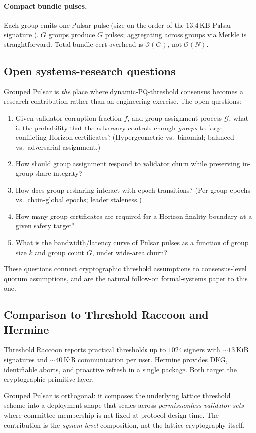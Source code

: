 \paragraph{Compact bundle pulses.}
Each group emits one Pulsar pulse (size on the order of the
$13.4\,\mathrm{KB}$ Pulsar signature \cite{pulsar}). $G$
groups produce $G$ pulses; aggregating across groups via Merkle is
straightforward. Total bundle-cert overhead is $\mathcal{O}(G)$, not
$\mathcal{O}(N)$.

\subsection{Open systems-research questions}

Grouped Pulsar is \emph{the} place where dynamic-PQ-threshold consensus
becomes a research contribution rather than an engineering exercise.
The open questions:

\begin{enumerate}[leftmargin=2em,nosep]
  \item Given validator corruption fraction $f$, and group assignment
        process $\mathcal{G}$, what is the probability that the
        adversary controls enough \emph{groups} to forge conflicting
        Horizon certificates? (Hypergeometric vs.\ binomial; balanced
        vs.\ adversarial assignment.)
  \item How should group assignment respond to validator churn while
        preserving in-group share integrity?
  \item How does group resharing interact with epoch transitions?
        (Per-group epochs vs.\ chain-global epochs; leader staleness.)
  \item How many group certificates are required for a Horizon
        finality boundary at a given safety target?
  \item What is the bandwidth/latency curve of Pulsar pulses as a
        function of group size $k$ and group count $G$, under
        wide-area churn?
\end{enumerate}

These questions connect cryptographic threshold assumptions to
consensus-level quorum assumptions, and are the natural follow-on
formal-systems paper to this one.

\subsection{Comparison to Threshold Raccoon and Hermine}

Threshold Raccoon \cite{thresholdraccoon} reports practical thresholds
up to $1024$ signers with $\sim 13\,\mathrm{KiB}$ signatures and
$\sim 40\,\mathrm{KiB}$ communication per user. Hermine \cite{hermine}
provides DKG, identifiable aborts, and proactive refresh in a single
package. Both target the cryptographic primitive layer.

Grouped Pulsar is orthogonal: it composes the underlying lattice
threshold scheme into a deployment shape that scales across
\emph{permissionless validator sets} where committee membership is not
fixed at protocol design time. The contribution is the
\emph{system-level} composition, not the lattice cryptography itself.

